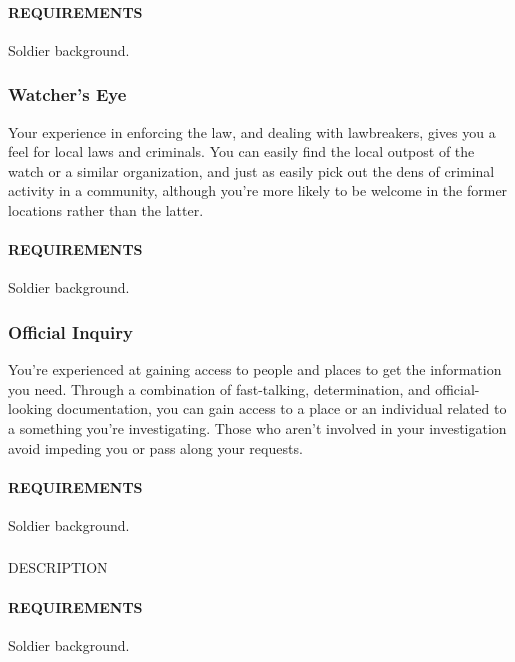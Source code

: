     \paragraph{REQUIREMENTS} Soldier background.

    \subsubsection{Watcher's Eye} \label{feat::watcherseye}
    Your experience in enforcing the law, and dealing with lawbreakers, gives you a feel for local laws and criminals.
    You can easily find the local outpost of the watch or a similar organization, and just as easily pick out the dens of criminal activity in a community, although you're more likely to be welcome in the former locations rather than the latter.

    \paragraph{REQUIREMENTS} Soldier background.

    \subsubsection{Official Inquiry} \label{feat::officialinquiry}
    You're experienced at gaining access to people and places to get the information you need.
    Through a combination of fast-talking, determination, and official-looking documentation, you can gain access to a place or an individual related to a something you're investigating.
    Those who aren't involved in your investigation avoid impeding you or pass along your requests.
    \paragraph{REQUIREMENTS} Soldier background.

    \subsubsection{} \label{feat::NAME}
    DESCRIPTION
    \paragraph{REQUIREMENTS} Soldier background.

